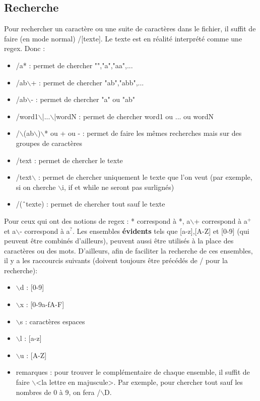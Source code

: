 \documentclass{article}
\begin{document}
\subsection{Recherche}
Pour rechercher un caractère ou une suite de caractères dans le fichier, il suffit de faire (en mode normal) /[texte]. Le texte est en réalité interprété comme une regex. Donc :
\begin{itemize}
    \item /a* : permet de chercher "","a","aa",...
    \item /ab$\backslash$+ : permet de chercher "ab","abb",...
    \item /ab$\backslash$- : permet de chercher "a" ou "ab"
    \item /word1$\backslash$|...$\backslash$|wordN : permet de chercher word1 ou ... ou wordN
    \item /$\backslash$(ab$\backslash$)$\backslash$* ou + ou - : permet de faire les mêmes recherches mais sur des groupes de caractères 
    \item /text : permet de chercher le texte
    \item /text$\backslash$ : permet de chercher uniquement le texte que l'on veut (par exemple, si on cherche $\backslash$i, if et while ne seront pas surlignés)
    \item /(\^\ texte) : permet de chercher tout sauf le texte
\end{itemize}
Pour ceux qui ont des notions de regex : * correspond à *, a$\backslash$+ correspond à a$^{+}$ et a$\backslash$- correspond à a$^{?}$. Les ensembles \textbf{évidents} tels que [a-z],[A-Z] et [0-9] (qui peuvent être combinés d'ailleurs), peuvent aussi être utilisés à la place des caractères ou des mots. D'ailleurs, afin de faciliter la recherche de ces ensembles, il y a les raccourcis suivants (doivent toujours être précédés de / pour la recherche):
\begin{itemize}
    \item $\backslash$d : [0-9]
    \item $\backslash$x : [0-9a-fA-F]
    \item $\backslash$s : caractères espaces
    \item $\backslash$l : [a-z]
    \item $\backslash$u : [A-Z]
    \item remarques : pour trouver le complémentaire de chaque ensemble, il suffit de faire $\backslash$<la lettre en majuscule>. Par exemple, pour chercher tout sauf les nombres de 0 à 9, on fera /$\backslash$D.
\end{itemize}
\end{document}
